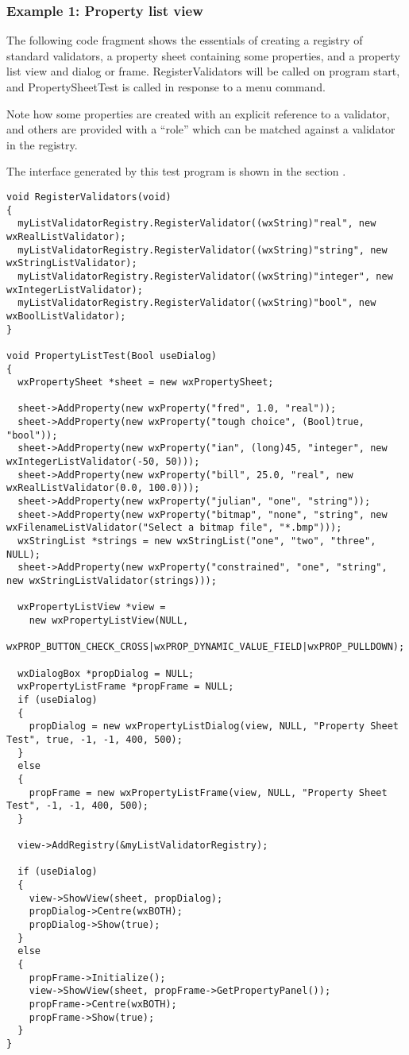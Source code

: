 \subsubsection{Example 1: Property list view}

The following code fragment shows the essentials of creating a registry of
standard validators, a property sheet containing some properties, and
a property list view and dialog or frame. RegisterValidators will be
called on program start, and PropertySheetTest is called in response to a
menu command.

Note how some properties are created with an explicit reference to
a validator, and others are provided with a ``role'' which can be matched
against a validator in the registry.

The interface generated by this test program is shown in the section .

\begin{verbatim}
void RegisterValidators(void)
{
  myListValidatorRegistry.RegisterValidator((wxString)"real", new wxRealListValidator);
  myListValidatorRegistry.RegisterValidator((wxString)"string", new wxStringListValidator);
  myListValidatorRegistry.RegisterValidator((wxString)"integer", new wxIntegerListValidator);
  myListValidatorRegistry.RegisterValidator((wxString)"bool", new wxBoolListValidator);
}

void PropertyListTest(Bool useDialog)
{
  wxPropertySheet *sheet = new wxPropertySheet;

  sheet->AddProperty(new wxProperty("fred", 1.0, "real"));
  sheet->AddProperty(new wxProperty("tough choice", (Bool)true, "bool"));
  sheet->AddProperty(new wxProperty("ian", (long)45, "integer", new wxIntegerListValidator(-50, 50)));
  sheet->AddProperty(new wxProperty("bill", 25.0, "real", new wxRealListValidator(0.0, 100.0)));
  sheet->AddProperty(new wxProperty("julian", "one", "string"));
  sheet->AddProperty(new wxProperty("bitmap", "none", "string", new wxFilenameListValidator("Select a bitmap file", "*.bmp")));
  wxStringList *strings = new wxStringList("one", "two", "three", NULL);
  sheet->AddProperty(new wxProperty("constrained", "one", "string", new wxStringListValidator(strings)));

  wxPropertyListView *view =
    new wxPropertyListView(NULL,
     wxPROP_BUTTON_CHECK_CROSS|wxPROP_DYNAMIC_VALUE_FIELD|wxPROP_PULLDOWN);

  wxDialogBox *propDialog = NULL;
  wxPropertyListFrame *propFrame = NULL;
  if (useDialog)
  {
    propDialog = new wxPropertyListDialog(view, NULL, "Property Sheet Test", true, -1, -1, 400, 500);
  }
  else
  {
    propFrame = new wxPropertyListFrame(view, NULL, "Property Sheet Test", -1, -1, 400, 500);
  }
  
  view->AddRegistry(&myListValidatorRegistry);

  if (useDialog)
  {
    view->ShowView(sheet, propDialog);
    propDialog->Centre(wxBOTH);
    propDialog->Show(true);
  }
  else
  {
    propFrame->Initialize();
    view->ShowView(sheet, propFrame->GetPropertyPanel());
    propFrame->Centre(wxBOTH);
    propFrame->Show(true);
  }
}
\end{verbatim}

